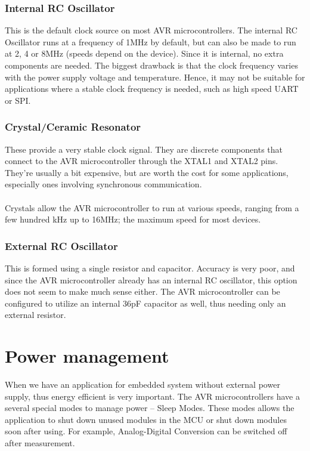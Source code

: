 \documentclass[english]{article}
\begin{document}
\subsubsection{Internal RC Oscillator}
This is the default clock source on most AVR microcontrollers. The internal RC Oscillator runs at a frequency of 1MHz by default, but can also be made to run at 2, 4 or 8MHz (speeds depend on the device). Since it is internal, no extra components are needed. The biggest drawback is that the clock frequency varies with the power supply voltage and temperature. Hence, it may not be suitable for applications where a stable clock frequency is needed, such as high speed UART or SPI.
\subsubsection{Crystal/Ceramic Resonator}
These provide a very stable clock signal. They are discrete components that connect to the AVR microcontroller through the XTAL1 and XTAL2 pins. They're usually a bit expensive, but are worth the cost for some applications, especially ones involving synchronous communication. \\\\
Crystals allow the AVR microcontroller to run at various speeds, ranging from a few hundred kHz up to 16MHz; the maximum speed for most devices. 
\subsubsection{External RC Oscillator}
This is formed using a single resistor and capacitor. Accuracy is very poor, and since the AVR microcontroller already has an internal RC oscillator, this option does not seem to make much sense either. The AVR microcontroller can be configured to utilize an internal 36pF capacitor as well, thus needing only an external resistor.


\section{Power management}
When we have an application for embedded system without external power supply, thus energy efficient is very important. The AVR microcontrollers have a several special modes to manage power – Sleep Modes. These modes allows the application to shut down unused modules in the MCU or shut down modules soon after using. For example, Analog-Digital Conversion can be switched off after measurement.
\end{document}
